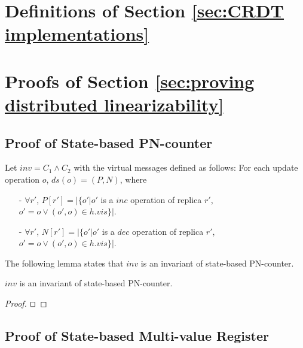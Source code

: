 \section{Definitions of Section \ref{sec:CRDT implementations}}
\label{sec:appendix definitions of section CRDT implementations}








\section{Proofs of Section \ref{sec:proving distributed linearizability}}
\label{sec:appendix proofs of section proving distributed linearizability}









\subsection{Proof of State-based PN-counter}
\label{subsec:appendix proof of state-based PN-counter} 

Let $\mathit{inv} = C_1 \wedge C_2$ with the virtual messages defined as follows: For each update operation $o$, $\mathit{ds}(o) = (P,N)$, where

\begin{itemize}
\setlength{\itemsep}{0.5pt}
\item[-] $\forall r'$, $P[r'] = \vert \{ o' \vert o'$ is a $\mathit{inc}$ operation of replica $r'$, $o' = o \vee (o',o) \in h.\mathit{vis} \} \vert$.

\item[-] $\forall r'$, $N[r'] = \vert \{ o' \vert o'$ is a $\mathit{dec}$ operation of replica $r'$, $o' = o \vee (o',o) \in h.\mathit{vis} \} \vert$.
\end{itemize} 

The following lemma states that $\mathit{inv}$ is an invariant of state-based PN-counter. 

\begin{lemma}
\label{lemma:inv is an invariant of state-based CRDT for state-based PN-counter} 
$\mathit{inv}$ is an invariant of state-based PN-counter. 
\end{lemma}

\begin {proof}

$\qed$
\end {proof}




\subsection{Proof of State-based Multi-value Register}
\label{subsec:appendix proof of state-based multi-value register}

